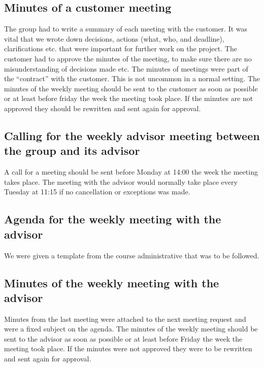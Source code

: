 \newpage

\subsection{Minutes of a customer meeting}
The group had to write a summary of each meeting with the customer. It was vital that we wrote down decisions, actions (what, who, and deadline), clarifications etc. that were important for further work on the project. The customer had to approve the minutes of the meeting, to make sure there are no misunderstanding of decisions made etc. The minutes of meetings were part of the “contract” with the customer. This is not uncommon in a normal setting.
\newline
\newline
The minutes of the weekly meeting should be sent to the customer as soon as possible or at least before friday the week the meeting took place. If the minutes are not approved they should be rewritten and sent again for approval. 

\subsection{Calling for the weekly advisor meeting between the group and its advisor}
A call for a meeting should be sent before Monday at 14:00 the week the meeting takes place. The meeting with the advisor would normally take place every Tuesday at 11:15 if no cancellation or exceptions was made.

\subsection{Agenda for the weekly meeting with the advisor}
We were given a template from the course administrative that was to be followed.

\subsection{Minutes of the weekly meeting with the advisor}
Minutes from the last meeting were attached to the next meeting request and were a fixed subject on the agenda.
\newline
\newline
The minutes of the weekly meeting should be sent to the advisor as soon as possible or at least before Friday the week the meeting took place. If the minutes were not approved they were to be rewritten and sent again for approval. 


